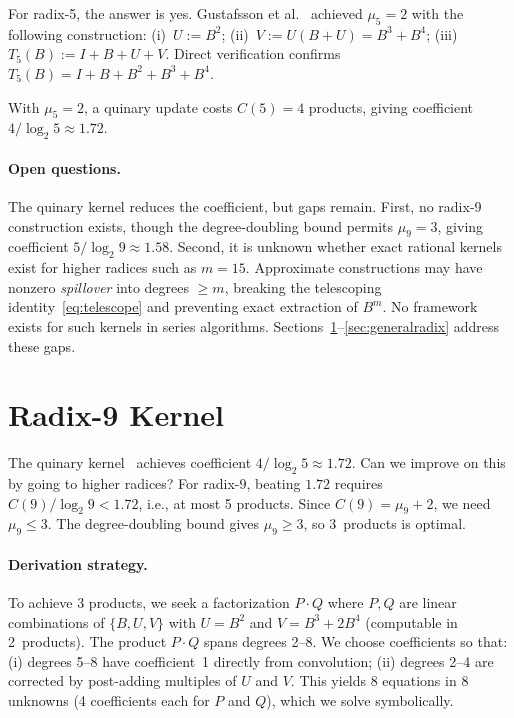 \documentclass[
  journal=largetwo,
  manuscript=article,
  manuscriptlabel={Research Preprint},
  logo=false,
  simfonts=false,
  year=2026,
  volume=1,
]{cup-journal}
\theoremstyle{definition}
\theoremstyle{remark}
\begin{document}
For radix-5, the answer is yes.
Gustafsson et al.~\cite{gustafsson2017} achieved $\mu_5 = 2$ with
the following construction:
(i)~$U := B^2$;
(ii)~$V := U(B + U) = B^3 + B^4$;
(iii)~$T_5(B) := I + B + U + V$.
Direct verification confirms $T_5(B) = I + B + B^2 + B^3 + B^4$.

With $\mu_5 = 2$, a quinary update costs $C(5) = 4$ products,
giving coefficient $4/\log_2 5 \approx 1.72$.

\paragraph{Open questions.}
The quinary kernel reduces the coefficient, but gaps remain.
First, no radix-9 construction exists, though
the degree-doubling bound permits $\mu_9 = 3$, giving coefficient
$5/\log_2 9 \approx 1.58$.
Second, it is unknown whether exact rational kernels exist for higher
radices such as $m = 15$. Approximate constructions may have nonzero
\emph{spillover} into degrees $\geq m$, breaking the telescoping
identity~\eqref{eq:telescope} and preventing exact extraction
of $B^m$. No framework exists for such kernels in series algorithms.
Sections~\ref{sec:kernel}--\ref{sec:generalradix} address these gaps.


\section{Radix-9 Kernel}
\label{sec:kernel}

The quinary kernel~\cite{gustafsson2017} achieves coefficient $4/\log_2 5 \approx 1.72$.
Can we improve on this by going to higher radices?
For radix-9, beating $1.72$ requires $C(9)/\log_2 9 < 1.72$, i.e., at most
5 products. Since $C(9) = \mu_9 + 2$, we need $\mu_9 \leq 3$. The
degree-doubling bound gives $\mu_9 \geq 3$, so 3~products is optimal.

\paragraph{Derivation strategy.}
To achieve 3 products, we seek a factorization $P \cdot Q$ where $P, Q$ are linear combinations of $\{B, U, V\}$ with $U = B^2$ and $V = B^3 + 2B^4$ (computable in 2~products).
The product $P \cdot Q$ spans degrees 2--8. We choose coefficients so that:
(i) degrees 5--8 have coefficient~1 directly from convolution; (ii) degrees
2--4 are corrected by post-adding multiples of $U$ and $V$. This yields 8
equations in 8 unknowns (4 coefficients each for $P$ and $Q$), which we solve
symbolically.
\end{document}
